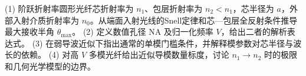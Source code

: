 (1) 阶跃折射率圆形光纤芯折射率为 \(n_1\)、包层折射率为 \(n_2<n_1\)，芯半径为 \(a\)，外部入射介质折射率为 \(n_0\)。从端面入射光线的Snell定律和芯—包层全反射条件推导最大接收半角 \(\theta_{\max}\)。
(2) 定义数值孔径 \(\mathrm{NA}\) 及归一化频率 \(V\)，给出二者的解析表达式。
(3) 在弱导波近似下指出通常的单模门槛条件，并解释模参数对芯半径与波长的依赖。
(4) 对高 \(V\) 多模光纤给出近似导模数量标度，讨论 \(n_1\to n_2\) 时的极限和几何光学模型的边界。
